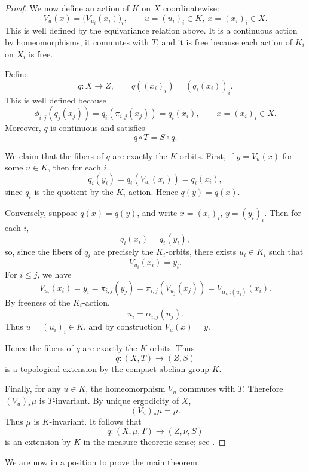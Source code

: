 \documentclass[12pt]{amsart}
\theoremstyle{plain}
\theoremstyle{definition}
\begin{document}
\begin{proof}
    We now define an action of $K$ on $X$ coordinatewise:
    \[
    V_u(x)=\bigl(V_{u_i}(x_i)\bigr)_i,
    \qquad
    u=(u_i)_i\in K,\ x=(x_i)_i\in X.
    \]
    This is well defined by the equivariance relation above.
    It is a continuous action by homeomorphisms, it commutes with $T$, and it is free because each action of $K_i$ on $X_i$ is free.

    Define
    \[
    q\colon X\to Z,\qquad q((x_i)_i)=(q_i(x_i))_i.
    \]
    This is well defined because
    \[
    \phi_{i,j}(q_j(x_j)) = q_i(\pi_{i,j}(x_j))=q_i(x_i),
    \qquad x = (x_i)_i\in X.
    \]
    Moreover, $q$ is continuous and satisfies
    \[
    q\circ T = S\circ q.
    \]

    We claim that the fibers of $q$ are exactly the $K$-orbits.
    First, if $y=V_u(x)$ for some $u\in K$, then for each $i$,
    \[
    q_i(y_i)=q_i(V_{u_i}(x_i))=q_i(x_i),
    \]
    since $q_i$ is the quotient by the $K_i$-action.
    Hence $q(y)=q(x)$.

    Conversely, suppose $q(x)=q(y)$, and write $x=(x_i)_i$, $y=(y_i)_i$.
    Then for each $i$,
    \[
    q_i(x_i)=q_i(y_i),
    \]
    so, since the fibers of $q_i$ are precisely the $K_i$-orbits, there exists $u_i\in K_i$ such that
    \[
    V_{u_i}(x_i)=y_i.
    \]
    For $i\leq j$, we have
    \[
    V_{u_i}(x_i)
    = y_i
    = \pi_{i,j}(y_j)
    = \pi_{i,j}(V_{u_j}(x_j))
    = V_{\alpha_{i,j}(u_j)}(x_i).
    \]
    By freeness of the $K_i$-action,
    \[
    u_i=\alpha_{i,j}(u_j).
    \]
    Thus $u=(u_i)_i\in K$, and by construction $V_u(x)=y$.

    Hence the fibers of $q$ are exactly the $K$-orbits.
    Thus
    \[
    q\colon (X,T)\to (Z,S)
    \]
    is a topological extension by the compact abelian group $K$.

    Finally, for any $u\in K$, the homeomorphism $V_u$ commutes with $T$.
    Therefore $(V_u)_*\mu$ is $T$-invariant.
    By unique ergodicity of $X$,
    \[
    (V_u)_*\mu=\mu.
    \]
    Thus $\mu$ is $K$-invariant.
    It follows that
    \[
    q\colon (X,\mu,T)\to (Z,\nu,S)
    \]
    is an extension by $K$ in the measure-theoretic sense; see \cite[Chapter~5, Proposition~1]{hk-book}.
\end{proof}

We are now in a position to prove the main theorem.
\end{document}
